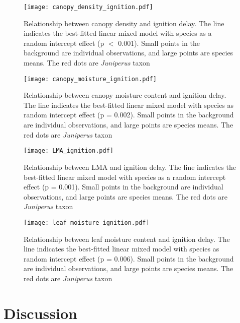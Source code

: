 \documentclass[12pt]{report}
\begin{document}
\begin{figure}
    \centering
    \texttt{[image: canopy\_density\_ignition.pdf]}
    \caption{Relationship between canopy density and ignition delay. The line indicates the best-fitted linear mixed model with species as a random intercept effect (p $<$ 0.001). Small points in the background are individual observations, and large points are species means. The red dots are \emph{Juniperus} taxon}
\end{figure}

\begin{figure}
    \centering
    \texttt{[image: canopy\_moisture\_ignition.pdf]}
    \caption{Relationship between canopy moisture content and ignition delay. The line indicates the best-fitted linear mixed model with species as random intercept effect (p = 0.002). Small points in the background are individual observations, and large points are species means. The red dots are \emph{Juniperus} taxon}
\end{figure}

\begin{figure}
    \centering
    \texttt{[image: LMA\_ignition.pdf]}
    \caption{Relationship between LMA and ignition delay. The line indicates the best-fitted linear mixed model with species as a random intercept effect (p = 0.001). Small points in the background are individual observations, and large points are species means. The red dots are \emph{Juniperus} taxon}
\end{figure}



\begin{figure}
    \centering
    \texttt{[image: leaf\_moisture\_ignition.pdf]}
    \caption{Relationship between leaf moisture content and ignition delay. The line indicates the best-fitted linear mixed model with species as random intercept effect (p = 0.006). Small points in the background are individual observations, and large points are species means.  The red dots are \emph{Juniperus} taxon}

\end{figure}





\section{Discussion}
\end{document}
